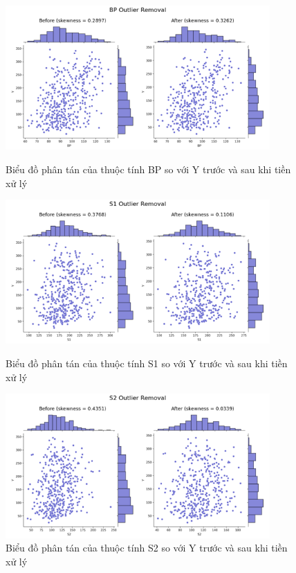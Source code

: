 \documentclass[runningheads]{llncs}
\begin{document}
\begin{figure}[H]
\centering
\includegraphics[width=0.9\textwidth]{BPOR}
\caption{Biểu đồ phân tán của thuộc tính BP so với Y trước và sau khi tiền xử lý} \label{fig2}
\vspace{0.5cm}
\includegraphics[width=0.9\textwidth]{S1OR}
\caption{Biểu đồ phân tán của thuộc tính S1 so với Y trước và sau khi tiền xử lý} \label{fig2}
\vspace{0.5cm}
\includegraphics[width=0.9\textwidth]{S2OR}
\caption{Biểu đồ phân tán của thuộc tính S2 so với Y trước và sau khi tiền xử lý} \label{fig2}
\end{figure}
\end{document}
